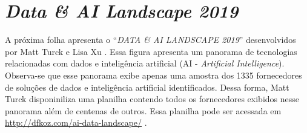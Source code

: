 \chapter{\emph{Data \& AI Landscape 2019}}
\label{anexo-landscape}

A próxima folha apresenta o ``\emph{DATA \& AI LANDSCAPE 2019}'' desenvolvidos por Matt Turck e Lisa Xu \cite{mattturck:principal,mattturck:trends}. Essa figura apresenta um panorama de tecnologias relacionadas com dados e inteligência artificial (AI - \emph{Artificial Intelligence}). Observa-se que esse panorama exibe apenas uma amostra dos 1335 fornecedores de soluções de dados e inteligência artificial identificados. Dessa forma, Matt Turck disponiniliza uma planilha contendo todos os fornecedores exibidos nesse panorama além de centenas de outros. Essa planilha pode ser acessada em \url{http://dfkoz.com/ai-data-landscape/} \cite{mattturck:sheet}.

\thispagestyle{empty}
\recalctypearea
    \begin{landscape}
        
    \end{landscape}
\recalctypearea
